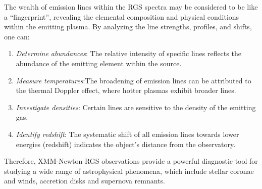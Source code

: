		The wealth of emission lines within the RGS spectra may be considered to be like a ``fingerprint'',  revealing the elemental composition and physical conditions within the emitting plasma. By analyzing the line strengths, profiles, and shifts, one can:
		\begin{enumerate}
			\item \textit{Determine abundances}: The relative intensity of specific lines reflects the abundance of the emitting element within the source.
			
			\item \textit{Measure temperatures}:The broadening of emission lines can be attributed to the thermal Doppler effect,
where hotter plasmas exhibit broader lines.
			
			\item \textit{Investigate densities}: Certain lines are sensitive to the density of the emitting gas.
			
			\item \textit{Identify redshift}: The systematic shift of all emission lines towards lower energies (redshift) indicates the object's distance from the observatory.
		\end{enumerate}
		
		Therefore, XMM-Newton RGS observations provide a powerful diagnostic tool for studying a wide range of astrophysical phenomena, which include stellar coronae and winds, accretion disks and supernova remnants.
		
